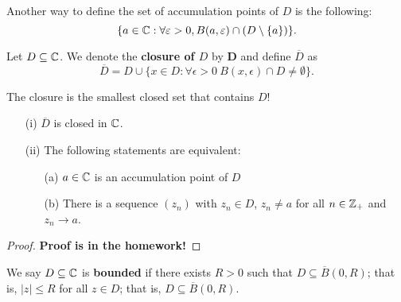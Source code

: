 \documentclass[a4paper]{report}
\begin{document}
Another way to define the set of accumulation points of \( D  \) is the following:
\[  \{ a \in \mathbb{C} : \forall \varepsilon > 0 , B(a,\varepsilon) \cap (D \setminus  \{ a \} ) \}. \]

\label{Closure of a set}

\begin{definition}[Closure]
    Let \( D \subseteq \mathbb{C} \). We denote the \textbf{closure of \( D \)} by \( \textbf{D} \) and define \( \overline{D} \) as 
    \[  \overline{D} = D \cup \{ x \in D : \forall \epsilon > 0  \  B(x,\epsilon) \cap D \neq \emptyset \}.  \]
\end{definition}

The closure is the smallest closed set that contains \( D  \)!

\begin{lemma}
    \begin{enumerate}
        \item[(i)] \( \overline{D} \) is closed in \( \mathbb{C}  \).
        \item[(ii)] The following statements are equivalent:
            \begin{enumerate}
                \item[(a)] \( a \in \mathbb{C}  \) is an accumulation point of \( D  \)
                \item[(b)] There is a sequence \( ({z}_{n}) \) with \( {z}_{n} \in D  \), \( {z}_{n} \neq a  \) for all \( n \in {\ensuremath{\mathbb{Z}}}_{+} \) and \( {z}_{n} \to a  \).
            \end{enumerate}
    \end{enumerate}
\end{lemma}

\begin{proof}
\textbf{Proof is in the homework!}
\end{proof}

\begin{definition}[Bounded]
    We say \( D \subseteq \mathbb{C}  \) is \textbf{bounded} if there exists \( R > 0  \) such that \( D \subseteq \overline{B}(0,R) \); that is, \( | z  |  \leq R  \) for all \( z \in D  \); that is, \( D \subseteq  \overline{B}(0,R) \).
\end{definition}
\end{document}
